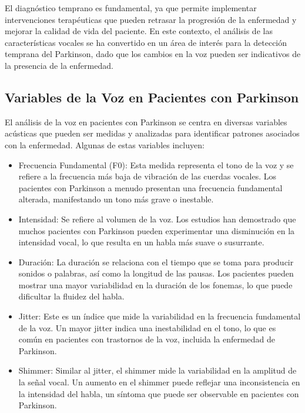 \documentclass[listof=nochaptergap,12pt,times,authoryear]{report}
\begin{document}
El diagnóstico temprano es fundamental, ya que permite implementar intervenciones terapéuticas que pueden retrasar la progresión de la enfermedad y mejorar la calidad de vida del paciente. En este contexto, el análisis de las características vocales se ha convertido en un área de interés para la detección temprana del Parkinson, dado que los cambios en la voz pueden ser indicativos de la presencia de la enfermedad.

\subsection{Variables de la Voz en Pacientes con Parkinson}

El análisis de la voz en pacientes con Parkinson se centra en diversas variables acústicas que pueden ser medidas y analizadas para identificar patrones asociados con la enfermedad. Algunas de estas variables incluyen:

\begin{itemize}
    \item Frecuencia Fundamental (F0): Esta medida representa el tono de la voz y se refiere a la frecuencia más baja de vibración de las cuerdas vocales. Los pacientes con Parkinson a menudo presentan una frecuencia fundamental alterada, manifestando un tono más grave o inestable.

    \item Intensidad: Se refiere al volumen de la voz. Los estudios han demostrado que muchos pacientes con Parkinson pueden experimentar una disminución en la intensidad vocal, lo que resulta en un habla más suave o susurrante.

    \item Duración: La duración se relaciona con el tiempo que se toma para producir sonidos o palabras, así como la longitud de las pausas. Los pacientes pueden mostrar una mayor variabilidad en la duración de los fonemas, lo que puede dificultar la fluidez del habla.

    \item Jitter: Este es un índice que mide la variabilidad en la frecuencia fundamental de la voz. Un mayor jitter indica una inestabilidad en el tono, lo que es común en pacientes con trastornos de la voz, incluida la enfermedad de Parkinson.

    \item Shimmer: Similar al jitter, el shimmer mide la variabilidad en la amplitud de la señal vocal. Un aumento en el shimmer puede reflejar una inconsistencia en la intensidad del habla, un síntoma que puede ser observable en pacientes con Parkinson.
\end{itemize}
\end{document}
